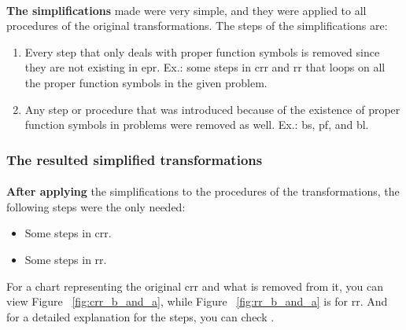 		\paragraph{}
		\textbf{The simplifications} made were very simple, and they were applied to all procedures of the original transformations. The steps of the simplifications are:
		
			\begin{enumerate}
				\item Every step that only deals with proper function symbols is removed since they are not existing in \ac{epr}. Ex.: some steps in \ac{crr} and \ac{rr} that loops on all the proper function symbols in the given problem.
				\item Any step or procedure that was introduced because of the existence of proper function symbols in problems were removed as well. Ex.: \ac{bs}, \ac{pf}, and \ac{bl}.
			\end{enumerate}
		
	\subsubsection{The resulted simplified transformations}
		\paragraph{}
		\textbf{After applying} the simplifications to the procedures of the transformations, the following steps were the only needed:
			
			\begin{itemize}
				\item Some steps in \ac{crr}.
				\item Some steps in \ac{rr}.
			\end{itemize}
			
		
		For a chart representing the original \ac{crr} and what is removed from it, you can view Figure ~\ref{fig:crr_b_and_a}, while Figure ~\ref{fig:rr_b_and_a} is for \ac{rr}. And for a detailed explanation for the steps, you can check \cite{BMUG06}. 
		

